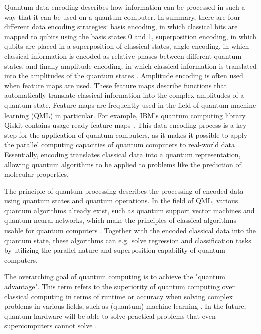 Quantum data encoding describes how information can be processed in such a way that it can be used on a quantum computer. In summary, there are four different data encoding strategies: basis encoding, in which classical bits are mapped to qubits using the basis states 0 and 1, superposition encoding, in which qubits are placed in a superposition of classical states, angle encoding, in which classical information is encoded as relative phases between different quantum states, and finally amplitude encoding, in which classical information is translated into the amplitudes of the quantum states \cite{rath2023quantum}. Amplitude encoding is  often used when feature maps are used. These feature maps describe functions that automatically translate classical information into the complex amplitudes of a quantum state. Feature maps are frequently used in the field of quantum machine learning (QML) in particular. \cite{schuld2015introduction} For example, IBM's quantum computing library Qiskit contains usage ready feature maps \cite{ZZFeatureMap}. This data encoding process is a key step for the application of quantum computers, as it makes it possible to apply the parallel computing capacities of quantum computers to real-world data \cite{rath2023quantum}. Essentially, encoding translates classical data into a quantum representation, allowing quantum algorithms to be applied to problems like the prediction of molecular properties.

The principle of quantum processing describes the processing of encoded data using quantum states and quantum operations. In the field of QML, various quantum algorithms already exist, such as quantum support vector machines and quantum neural networks, which make the principles of classical algorithms usable for quantum computers \cite{biamonte2017quantum}. Together with the encoded classical data into the quantum state, these algorithms can e.g. solve regression and classification tasks by utilizing the parallel nature and superposition capability of quantum computers. 

The overarching goal of quantum computing is to achieve the "quantum advantage". This term refers to the superiority of quantum computing over classical computing in terms of runtime or accuracy when solving complex problems in various fields, such as (quantum) machine learning \cite{daley2022practical}. In the future, quantum hardware will be able to solve practical problems that even supercomputers cannot solve \cite{Swayne_2023}.

